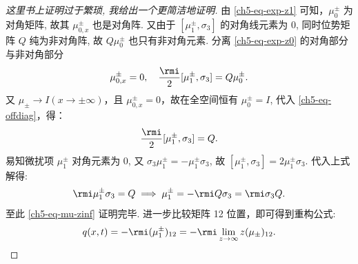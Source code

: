 \begin{proof}[这里书上证明过于繁琐, 我给出一个更简洁地证明]
    由 \eqref{ch5-eq-exp-z1} 可知，$\mu_{0}^{\pm}$ 为对角矩阵, 故其 $\mu_{0,x}^{\pm}$ 也是对角阵. 又由于 $[\mu_{1}^{\pm}, \sigma_{3}]$ 的对角线元素为 $0$, 同时位势矩阵 $Q$ 纯为非对角阵, 故 $Q\mu_{0}^{\pm}$ 也只有非对角元素. 分离 \eqref{ch5-eq-exp-z0} 的对角部分与非对角部分
    \begin{equation}
        \mu_{0,x}^{\pm} = 0, \quad
        \frac{\rmi}{2} [\mu_{1}^{\pm}, \sigma_{3}] = Q \mu_{0}^{\pm}. \label{ch5-eq-offdiag}
    \end{equation}
    又 $\mu_{\pm} \to I (x \to \pm\infty)$，且 $\mu_{0,x}^{\pm}=0$，故在全空间恒有 $\mu_{0}^{\pm} = I$, 代入 \eqref{ch5-eq-offdiag}，得：
    \begin{equation}
        \frac{\rmi}{2} [\mu_{1}^{\pm}, \sigma_{3}] = Q.
    \end{equation}
    易知微扰项 $\mu_{1}^{\pm}$ 对角元素为 $0$, 又 $\sigma_{3} \mu_{1}^{\pm} = -\mu_{1}^{\pm} \sigma_{3}$, 故 $[\mu_{1}^{\pm}, \sigma_{3}] = 2\mu_{1}^{\pm} \sigma_{3}$. 代入上式解得:
    \begin{equation}
        \rmi \mu_{1}^{\pm} \sigma_{3} = Q \implies \mu_{1}^{\pm} = -\rmi Q \sigma_{3} = \rmi \sigma_{3} Q.
    \end{equation}
    至此 \eqref{ch5-eq-mu-zinf} 证明完毕. 进一步比较矩阵 12 位置，即可得到重构公式:
    \begin{equation}
        q(x,t) = -\rmi (\mu_{1}^{\pm})_{12} = -\rmi \lim_{z \to \infty} z (\mu_{\pm})_{12}.
    \end{equation}
\end{proof}
